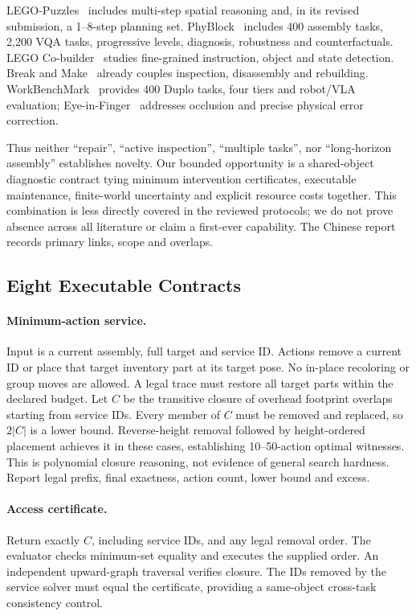 LEGO-Puzzles~\cite{tang2025legopuzzles} includes multi-step spatial
reasoning and, in its revised submission, a 1--8-step planning set.
PhyBlock~\cite{ma2025phyblock} includes 400 assembly tasks, 2,200 VQA
tasks, progressive levels, diagnosis, robustness and counterfactuals.
LEGO Co-builder~\cite{huang2025cobuilder} studies fine-grained instruction,
object and state detection. Break and Make~\cite{walsman2022break}
already couples inspection, disassembly and rebuilding.
WorkBenchMark~\cite{ma2026workbenchmark} provides 400 Duplo tasks,
four tiers and robot/VLA evaluation; Eye-in-Finger~\cite{tang2025eyefinger}
addresses occlusion and precise physical error correction.

Thus neither ``repair'', ``active inspection'', ``multiple tasks'',
nor ``long-horizon assembly'' establishes novelty. Our bounded
opportunity is a shared-object diagnostic contract tying minimum
intervention certificates, executable maintenance, finite-world
uncertainty and explicit resource costs together. This combination
is less directly covered in the reviewed protocols; we do not prove
absence across all literature or claim a first-ever capability.
The Chinese report records primary links, scope and overlaps.

\subsection{Eight Executable Contracts}
\paragraph{Minimum-action service.}
Input is a current assembly, full target and service ID.
Actions remove a current ID or place that target inventory part at its
target pose. No in-place recoloring or group moves are allowed.
A legal trace must restore all target parts within the declared budget.
Let $C$ be the transitive closure of overhead footprint overlaps
starting from service IDs. Every member of $C$ must be removed and
replaced, so $2|C|$ is a lower bound. Reverse-height removal followed
by height-ordered placement achieves it in these cases, establishing
10--50-action optimal witnesses. This is polynomial closure reasoning,
not evidence of general search hardness.
Report legal prefix, final exactness, action count, lower bound and excess.

\paragraph{Access certificate.}
Return exactly $C$, including service IDs, and any legal removal order.
The evaluator checks minimum-set equality and executes the supplied order.
An independent upward-graph traversal verifies closure. The IDs removed
by the service solver must equal the certificate, providing a same-object
cross-task consistency control.

